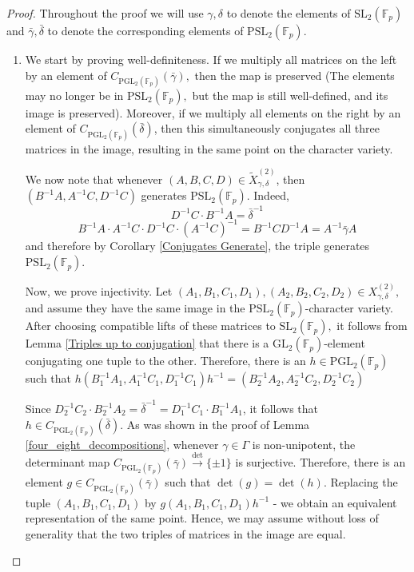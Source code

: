 \documentclass[letterpaper]{amsart}
\begin{document}
\begin{proof}
Throughout the proof we will use $\gamma, \delta$ to denote the elements of $\mathrm{SL}_2(\mathbb{F}_p)$ and $\bar{\gamma}, \bar{\delta}$ to denote the corresponding elements of $\mathrm{PSL}_2(\mathbb{F}_p).$
    \begin{enumerate}
    \item We start by proving well-definiteness. If we multiply all matrices on the left by an element of $C_{\mathrm{PGL}_2(\mathbb{F}_p)}(\bar{\gamma}),$ then the map is preserved (The elements may no longer be in $\mathrm{PSL}_2(\mathbb{F}_p),$ but the map is still well-defined, and its image is preserved). Moreover, if we multiply all elements on the right by an element of $C_{\mathrm{PGL}_2(\mathbb{F}_p)}(\bar{\delta})$, then this simultaneously conjugates all three matrices in the image, resulting in the same point on the character variety.

    We now note that whenever $(A, B, C, D) \in \tilde{X}_{\gamma, \delta}^{(2)}$, then $(B^{-1}A, A^{-1}C, D^{-1}C)$ generates $\mathrm{PSL}_2(\mathbb{F}_p).$ Indeed,
    $$D^{-1}C \cdot B^{-1}A = \bar{\delta}^{-1}$$
    $$B^{-1}A \cdot A^{-1}C \cdot D^{-1}C \cdot (A^{-1}C)^{-1} = B^{-1}CD^{-1}A = A^{-1} \bar{\gamma} A$$
    and therefore by Corollary \ref{Conjugates Generate}, the triple generates $\mathrm{PSL}_2(\mathbb{F}_p).$

    Now, we prove injectivity. Let $(A_1,B_1,C_1,D_1),(A_2,B_2,C_2,D_2) \in X_{\gamma, \delta}^{(2)},$ and assume they have the same image in the $\mathrm{PSL}_2(\mathbb{F}_p)$-character variety. After choosing compatible lifts of these matrices to $\mathrm{SL}_2(\mathbb{F}_p),$ it follows from Lemma \ref{Triples up to conjugation} that there is a $\mathrm{GL}_2(\mathbb{F}_p)$-element conjugating one tuple to the other. Therefore, there is an $h \in \mathrm{PGL}_2(\mathbb{F}_p)$ such that $h (B_1^{-1}A_1, A_1^{-1}C_1, D_1^{-1}C_1) h^{-1} = (B_2^{-1}A_2, A_2^{-1}C_2, D_2^{-1}C_2)$

    Since $D_2^{-1}C_2\cdot B_2^{-1}A_2=\bar{\delta}^{-1}=D_1^{-1}C_1\cdot B_1^{-1}A_1$, it follows that $h \in C_{\mathrm{PGL}_2(\mathbb{F}_p)}(\bar{\delta})$. As was shown in the proof of Lemma \ref{four_eight_decompositions}, whenever $\gamma \in \Gamma$ is non-unipotent, the determinant map $C_{\mathrm{PGL}_2(\mathbb{F}_p)}(\bar{\gamma}) \overset{\det}{\to} \{\pm 1\}$ is surjective. Therefore, there is an element $g \in C_{\mathrm{PGL}_2(\mathbb{F}_p)}(\bar{\gamma})$ such that $\det(g) = \det(h).$ Replacing the tuple $(A_1, B_1, C_1, D_1)$ by $g(A_1, B_1, C_1, D_1)h^{-1}$ - we obtain an equivalent representation of the same point. Hence, we may assume without loss of generality that the two triples of matrices in the image are equal.


\end{enumerate}
\end{proof}
\end{document}
